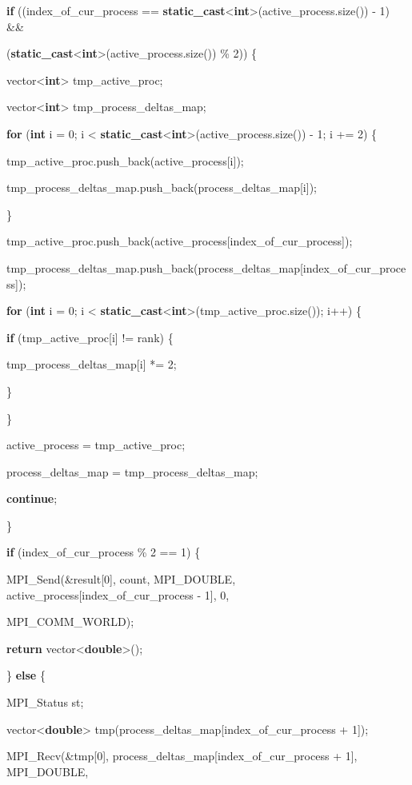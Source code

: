 \documentclass[]{article}
\begin{document}
\textbf{if} ((index\_of\_cur\_process ==
\textbf{static\_cast}\textless{}\textbf{int}\textgreater{}(active\_process.size())
- 1) \&\&

(\textbf{static\_cast}\textless{}\textbf{int}\textgreater{}(active\_process.size())
\% 2)) \{

vector\textless{}\textbf{int}\textgreater{} tmp\_active\_proc;

vector\textless{}\textbf{int}\textgreater{} tmp\_process\_deltas\_map;

\textbf{for} (\textbf{int} i = 0; i \textless{}
\textbf{static\_cast}\textless{}\textbf{int}\textgreater{}(active\_process.size())
- 1; i += 2) \{

tmp\_active\_proc.push\_back(active\_process{[}i{]});

tmp\_process\_deltas\_map.push\_back(process\_deltas\_map{[}i{]});

\}

tmp\_active\_proc.push\_back(active\_process{[}index\_of\_cur\_process{]});

tmp\_process\_deltas\_map.push\_back(process\_deltas\_map{[}index\_of\_cur\_process{]});

\textbf{for} (\textbf{int} i = 0; i \textless{}
\textbf{static\_cast}\textless{}\textbf{int}\textgreater{}(tmp\_active\_proc.size());
i++) \{

\textbf{if} (tmp\_active\_proc{[}i{]} != rank) \{

tmp\_process\_deltas\_map{[}i{]} *= 2;

\}

\}

active\_process = tmp\_active\_proc;

process\_deltas\_map = tmp\_process\_deltas\_map;

\textbf{continue};

\}

\textbf{if} (index\_of\_cur\_process \% 2 == 1) \{

MPI\_Send(\&result{[}0{]}, count, MPI\_DOUBLE,
active\_process{[}index\_of\_cur\_process - 1{]}, 0,

MPI\_COMM\_WORLD);

\textbf{return} vector\textless{}\textbf{double}\textgreater{}();

\} \textbf{else} \{

MPI\_Status st;

vector\textless{}\textbf{double}\textgreater{}
tmp(process\_deltas\_map{[}index\_of\_cur\_process + 1{]});

MPI\_Recv(\&tmp{[}0{]}, process\_deltas\_map{[}index\_of\_cur\_process +
1{]}, MPI\_DOUBLE,
\end{document}
